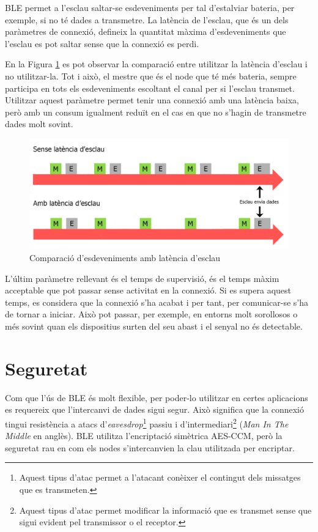 BLE permet a l'esclau saltar-se esdeveniments per tal d'estalviar bateria, per exemple, si no té dades a transmetre.
La latència de l'esclau, que és un dels paràmetres de connexió, defineix la quantitat màxima d'esdeveniments que l'esclau es pot saltar sense que la connexió es perdi.

En la Figura \ref{fig:slave_latency} es pot observar la comparació entre utilitzar la latència d'esclau i no utilitzar-la.
Tot i això, el mestre que és el node que té més bateria, sempre participa en tots els esdeveniments escoltant el canal per si l'esclau transmet.
Utilitzar aquest paràmetre permet tenir una connexió amb una latència baixa, però amb un consum igualment reduït en el cas en que no s'hagin de transmetre dades molt sovint.

\begin{figure}[!h]
	\begin{center}
		\includegraphics{./images/slave_latency_new.jpeg}
		\caption{Comparació d'esdeveniments amb latència d'esclau \cite{slave_latency}}
		\label{fig:slave_latency}
	\end{center}
\end{figure}

L'últim paràmetre rellevant és el temps de supervisió, és el temps màxim acceptable que pot passar sense activitat en la connexió.
Si es supera aquest temps, es considera que la connexió s'ha acabat i per tant, per comunicar-se s'ha de tornar a iniciar.
Això pot passar, per exemple, en entorns molt sorollosos o més sovint quan els dispositius surten del seu abast i el senyal no és detectable.

\section{Seguretat}
\label{sec:security}
Com que l'ús de BLE és molt flexible, per poder-lo utilitzar en certes aplicacions es requereix que l'intercanvi de dades sigui segur.
Això significa que la connexió tingui resistència a atacs d'\textit{eavesdrop}\footnote{Aquest tipus d'atac permet a l'atacant conèixer el contingut dels missatges que es transmeten.} passiu i d'intermediari\footnote{Aquest tipus d'atac permet modificar la informació que es transmet sense que sigui evident pel transmissor o el receptor.} (\textit{Man In The Middle} en anglès).
BLE utilitza l'encriptació simètrica AES-CCM, però la seguretat rau en com els nodes s'intercanvien la clau utilitzada per encriptar.

